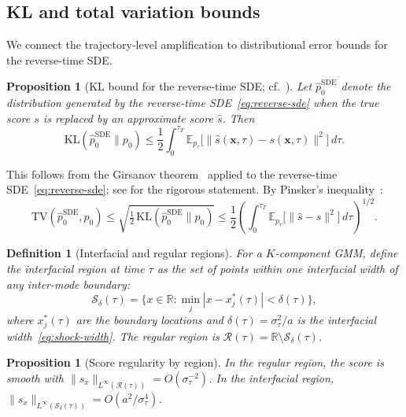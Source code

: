 \documentclass[11pt]{article}
\newtheorem{proposition}[theorem]{Proposition}
\newtheorem{definition}[theorem]{Definition}
\newcommand{\R}{\mathbb{R}}
\newcommand{\E}{\mathbb{E}}
\newcommand{\KL}{\mathrm{KL}}
\newcommand{\TV}{\mathrm{TV}}
\begin{document}
\subsection{KL and total variation bounds}\label{sec:amp:kl}

We connect the trajectory-level amplification to distributional error bounds for the reverse-time SDE.

\begin{proposition}[KL bound for the reverse-time SDE; cf.\ {\citealp{chen2023sampling}}]\label{prop:kl-bound}
Let $\hat{p}_0^{\mathrm{SDE}}$ denote the distribution generated by the reverse-time SDE~\eqref{eq:reverse-sde} when the true score $s$ is replaced by an approximate score $\hat{s}$.
Then
\begin{equation}\label{eq:kl-bound}
  \KL(\hat{p}_0^{\mathrm{SDE}} \| p_0)
  \leq \frac{1}{2}\int_0^{\tau_T} \E_{p_\tau}\!\bigl[\|\hat{s}(\bm{x},\tau) - s(\bm{x},\tau)\|^2\bigr]\,d\tau.
\end{equation}
\end{proposition}

This follows from the Girsanov theorem~\citep{girsanov1960transforming} applied to the reverse-time SDE~\eqref{eq:reverse-sde}; see \citet[Theorem~1]{chen2023sampling} for the rigorous statement.
By Pinsker's inequality~\citep{tsybakov2009introduction}:
\begin{equation}\label{eq:pinsker}
  \TV(\hat{p}_0^{\mathrm{SDE}}, p_0)
  \leq \sqrt{\tfrac{1}{2}\,\KL(\hat{p}_0^{\mathrm{SDE}} \| p_0)}
  \leq \frac{1}{2}\!\left(\int_0^{\tau_T} \E_{p_\tau}\!\bigl[\|\hat{s} - s\|^2\bigr]\,d\tau\right)^{\!1/2}.
\end{equation}

\begin{definition}[Interfacial and regular regions]\label{def:regions}
For a $K$-component GMM, define the \emph{interfacial region} at time $\tau$ as the set of points within one interfacial width of any inter-mode boundary:
\begin{equation}\label{eq:shock-region}
  \mathcal{S}_\delta(\tau) = \bigl\{x \in \R : \min_j |x - x_j^\ast(\tau)| < \delta(\tau)\bigr\},
\end{equation}
where $x_j^\ast(\tau)$ are the boundary locations and $\delta(\tau) = \sigma_\tau^2/a$ is the interfacial width~\eqref{eq:shock-width}.
The \emph{regular region} is $\mathcal{R}(\tau) = \R \setminus \mathcal{S}_\delta(\tau)$.
\end{definition}

\begin{proposition}[Score regularity by region]\label{prop:regularity}
In the regular region, the score is smooth with $\|s_x\|_{L^\infty(\mathcal{R}(\tau))} = O(\sigma_\tau^{-2})$.
In the interfacial region, $\|s_x\|_{L^\infty(\mathcal{S}_\delta(\tau))} = O(a^2/\sigma_\tau^4)$.
\end{proposition}
\end{document}
